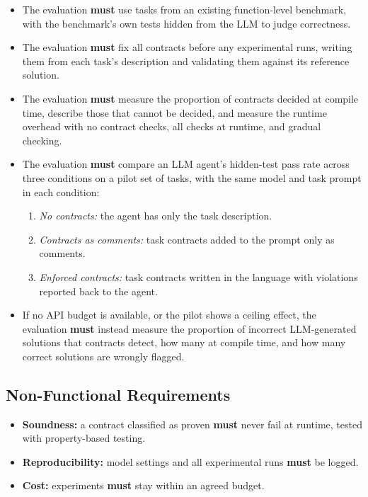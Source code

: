 \documentclass[11pt,a4paper,titlepage]{article}
\begin{document}
\begin{itemize}
  \item The evaluation \textbf{must} use tasks from an existing function-level benchmark, with the benchmark's own tests hidden from the LLM to judge correctness.
  \item The evaluation \textbf{must} fix all contracts before any experimental runs, writing them from each task's description and validating them against its reference solution.
  \item The evaluation \textbf{must} measure the proportion of contracts decided at compile time, describe those that cannot be decided, and measure the runtime overhead with no contract checks, all checks at runtime, and gradual checking.
  \item The evaluation \textbf{must} compare an LLM agent's hidden-test pass rate across three conditions on a pilot set of tasks, with the same model and task prompt in each condition:
  \begin{enumerate}
    \item \emph{No contracts:} the agent has only the task description.
    \item \emph{Contracts as comments:} task contracts added to the prompt only as comments.
    \item \emph{Enforced contracts:} task contracts written in the language with violations reported back to the agent.
  \end{enumerate}
  \item If no API budget is available, or the pilot shows a ceiling effect, the evaluation \textbf{must} instead measure the proportion of incorrect LLM-generated solutions that contracts detect, how many at compile time, and how many correct solutions are wrongly flagged.
\end{itemize}

\subsection{Non-Functional Requirements}
\begin{itemize}
  \item \textbf{Soundness:} a contract classified as proven \textbf{must} never fail at runtime, tested with property-based testing.
  \item \textbf{Reproducibility:} model settings and all experimental runs \textbf{must} be logged.
  \item \textbf{Cost:} experiments \textbf{must} stay within an agreed budget.
\end{itemize}
\end{document}
